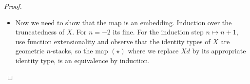 \begin{proof}
\begin{itemize}
\[\begin{tikzcd}
	{\prod_{d :D'}W d} & {\prod_{d : D} W(jd)} \\
	{\prod_{d :D'} X d} & {\prod_{d : D} X(jd)}
	\arrow["\sim", from=1-1, to=1-2]
	\arrow[from=1-1, to=2-1]
	\arrow["{\bT -surj}", from=1-2, to=2-2]
	\arrow[from=2-1, to=2-2]
\end{tikzcd}\]
\item
Now we need to show that the map is an embedding. Induction over the truncatedness of $X$. For $n=-2$ its fine.
For the induction step $n \mapsto n+1$, use function extensionality and observe that the identity types of $X$ are geometric $n$-stacks, so the map $(\star)$ where we replace $X d$ by its appropriate identity type, is an equivalence by induction.
\end{itemize}
\end{proof}





